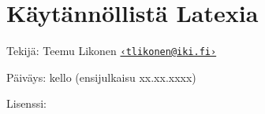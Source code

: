 \clearpage
\restoregeometry
{}

\null\vfill

{
  \setlength{\parindent}{0em}
  \setlength{\parskip}{1.2ex}

  \section*{Käytännöllistä Latexia}

  Tekijä: Teemu Likonen
  \href{mailto:tlikonen@iki.fi}{\nolinkurl{‹tlikonen@iki.fi›}}

  Päiväys: \DTMtoday{} kello \DTMcurrenttime{} (ensijulkaisu xx.xx.xxxx)

  Lisenssi:

}
